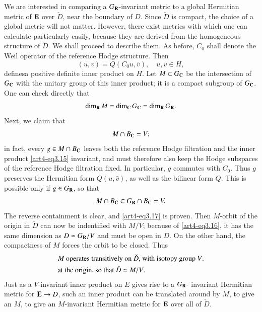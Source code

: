 We are interested in comparing a $G_{\mathbf{R}}$-invariant metric to a global Hermitian metric of $\mathbf{E}$ over $\check{D}$, near the boundary of $D$. Since $\check{D}$ is compact, the choice of a global metric will not matter. However, there exist metrics with which one can calculate particularly easily, because they are derived from the homogeneous structure of $\check{D}$. We shall proceed to describe them. As before, $C_0$ shall denote the Weil operator of the reference Hodge structure. Then
\setcounter{equation}{14}
\begin{equation}
(u,v) = Q(C_0 u , \bar{v}), \quad u, v \in H,  \label{art4-eq3.15}
\end{equation}
defines\pageoriginale a positive definite inner product on $H$. Let $M \subset G_{\mathbf{C}}$ be the intersection of $G_{\mathbf{C}}$ with the unitary group of this inner product; it is a compact subgroup of $G_{\mathbf{C}}$. One can check directly that
\begin{equation}
\dim_{\mathbf{R}}  M = \dim_{\mathbf{C}} G_{\mathbf{C}} = \dim_{\mathbf{R}} G_{\mathbf{R}} . \label{art4-eq3.16}
\end{equation}
Next, we claim that 
\begin{equation}
M \cap B_{\mathbf{C}} = V; \label{art4-art3.17}
\end{equation}
in fact, every $g \in M \cap B_{\mathbf{C}}$ leaves both the reference Hodge filtration and the inner product \eqref{art4-eq3.15} invariant, and must therefore also keep the Hodge subspaces of the reference Hodge filtration fixed. In particular, $g$ commutes with $C_0$. Thus $g$ preserves the Hermitian form $Q(u,\bar{v})$, as well as the bilinear form $Q$. This is possible only if $g \in G_{\mathbf{R}}$, so that
$$
M \cap B_{\mathbf{C}} \subset G_{\mathbf{R}} \cap B_{\mathbf{C}} = V.
$$
The reverse containment is clear, and \eqref{art4-eq3.17} is proven. Then $M$-orbit of the origin in $\check{D}$ can now be indentified with $M/V$; because of \eqref{art4-eq3.16}, it has the same dimension as $D \simeq G_{\mathbf{R}} / V$ and must be open in $D$. On the other hand, the compactness of $M$ forces the orbit to be closed. Thus
\begin{align}
& \text{$M$ operates transitively on $\check{D}$, with isotopy group $V$.} \notag\\
& \text{at the origin, so that $\check{D} \simeq M / V$.}\label{art4-eq3.18}
\end{align}
Just as a $V$-invariant inner product on $E$ gives rise to a $G_{\mathbf{R}}$- invariant Hermitian metric for $\mathbf{E} \to D$, such an inner product can be translated around by $M$, to give an $M$, to give an $M$-invariant Hermitian metric for $\mathbf{E}$ over all of $\check{D}$.

